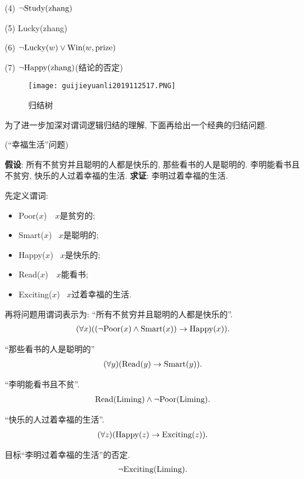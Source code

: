     (4) $\neg \textup{Study}(\textup{zhang})$

    (5) \textup{Lucky}(\textup{zhang})

    (6) $\neg \textup{Lucky}(w)\vee \textup{Win}(w, \textup{prize})$

    (7) $\neg \textup{Happy}(\textup{zhang})$(结论的否定)
\begin{figure}[H]
\centering
\texttt{[image: guijieyuanli2019112517.PNG]}
\caption{归结树}
\label{AI32fig17}
\end{figure}

为了进一步加深对谓词逻辑归结的理解, 下面再给出一个经典的归结问题.
\begin{example}
(“幸福生活”问题)

\textbf{假设}: 所有不贫穷并且聪明的人都是快乐的, 那些看书的人是聪明的. 李明能看书且不贫穷, 快乐的人过着幸福的生活.
\textbf{求证}: 李明过着幸福的生活.
\end{example}
\begin{result}
先定义谓词:
\begin{itemize}
\item Poor($x$)    \,\,  $x$是贫穷的;
\item Smart($x$)   \,  $x$是聪明的;
\item Happy($x$)    \, $x$是快乐的;
\item Read($x$)     \,\, $x$能看书;
\item Exciting($x$) \, $x$过着幸福的生活.
\end{itemize}

再将问题用谓词表示为: “所有不贫穷并且聪明的人都是快乐的”.
\begin{align}
  (\forall x)((\neg \textup{Poor}(x)\wedge \textup{Smart}(x))\rightarrow \textup{Happy}(x)).
\end{align}

“那些看书的人是聪明的”
\begin{align}
  (\forall y) (\textup{Read}(y) \rightarrow  \textup{Smart}(y)).
\end{align}

“李明能看书且不贫”.
\begin{align}
  \textup{Read}(\textup{Liming})\wedge \neg \textup{Poor}(\textup{Liming}).
\end{align}

“快乐的人过着幸福的生活”.
\begin{align}
  (\forall z) (\textup{Happy}(z)\rightarrow \textup{Exciting}(z)).
\end{align}

目标“李明过着幸福的生活”的否定.
\begin{align}
  \neg \textup{Exciting}(\textup{Liming}).
\end{align}
\end{result}

